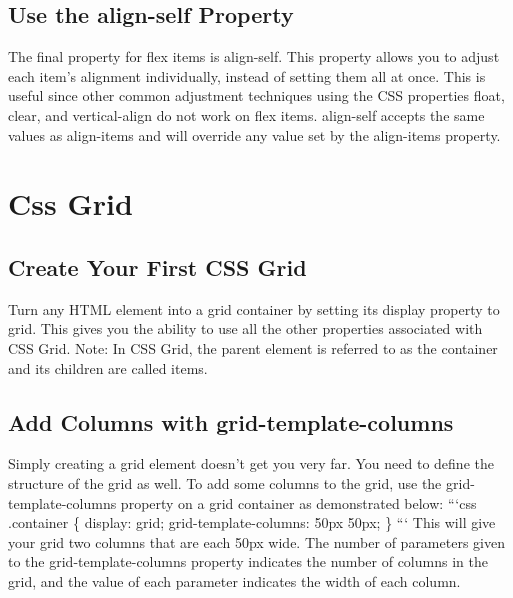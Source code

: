 \documentclass{article}%
\begin{document}
%
\subsection{Use the align{-}self Property}%
\label{subsec:Usethealign{-}selfProperty}%
The final property for flex items is align{-}self. This property allows you to adjust each item's alignment individually, instead of setting them all at once. This is useful since other common adjustment techniques using the CSS properties float, clear, and vertical{-}align do not work on flex items.\newline%
align{-}self accepts the same values as align{-}items and will override any value set by the align{-}items property.\newline%

%
\newpage%
\section{Css Grid}%
\label{sec:CssGrid}%
\subsection{Create Your First CSS Grid}%
\label{subsec:CreateYourFirstCSSGrid}%
Turn any HTML element into a grid container by setting its display property to grid. This gives you the ability to use all the other properties associated with CSS Grid.\newline%
Note: In CSS Grid, the parent element is referred to as the container and its children are called items.\newline%

%
\subsection{Add Columns with grid{-}template{-}columns}%
\label{subsec:AddColumnswithgrid{-}template{-}columns}%
Simply creating a grid element doesn't get you very far. You need to define the structure of the grid as well. To add some columns to the grid, use the grid{-}template{-}columns property on a grid container as demonstrated below:\newline%
```css\newline%
.container \{\newline%
  display: grid;\newline%
  grid{-}template{-}columns: 50px 50px;\newline%
\}\newline%
```\newline%
This will give your grid two columns that are each 50px wide.\newline%
The number of parameters given to the grid{-}template{-}columns property indicates the number of columns in the grid, and the value of each parameter indicates the width of each column.\newline%
\end{document}
